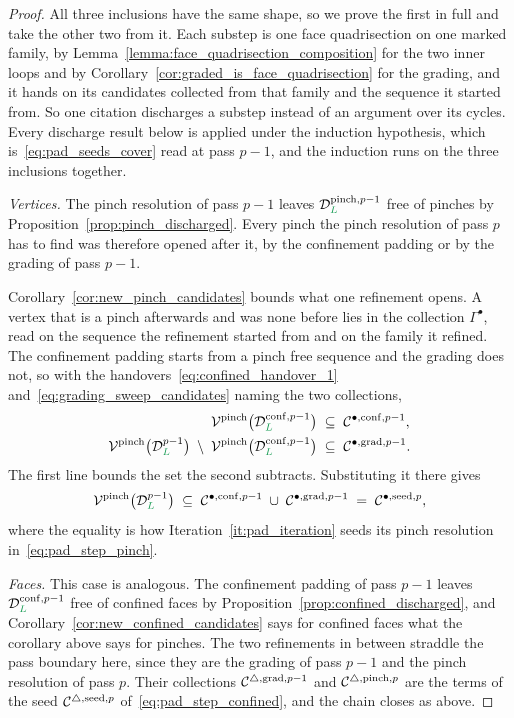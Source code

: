 \documentclass[a4paper, 12pt]{article}
\makeatletter
\newcommand{\collectV}{\Gamma^{\bullet}}                         %
\DeclareRobustCommand{\candV}[1][]{\mathcal{C}^{\bullet\ifx\@empty#1\@empty\else,#1\fi}}
\DeclareRobustCommand{\candF}[1][]{\mathcal{C}^{\triangle\ifx\@empty#1\@empty\else,#1\fi}}
\newcommand{\green}{\color{ForestGreen}}
\newcommand{\V}{\mathcal{V}}
\renewcommand{\L}{{\green L}}
\theoremstyle{definition}
\theoremstyle{plain}
\numberwithin{equation}{section}
\DeclareRobustCommand{\domseq}[1][]{\mathcal{D}\ifx\@empty#1\@empty\else_{#1}\fi}
\makeatother
\begin{document}
\begin{proof}
    All three inclusions have the same shape, so we prove the first in full and take the other two from it. Each substep is one face quadrisection on one marked family, by Lemma~\ref{lemma:face_quadrisection_composition} for the two inner loops and by Corollary~\ref{cor:graded_is_face_quadrisection} for the grading, and it hands on its candidates collected from that family and the sequence it started from. So one citation discharges a substep instead of an argument over its cycles. Every discharge result below is applied under the induction hypothesis, which is~\eqref{eq:pad_seeds_cover} read at pass $p \! - \! 1$, and the induction runs on the three inclusions together.

    \emph{Vertices.} The pinch resolution of pass $p \! - \! 1$ leaves $\domseq[\L]^{\mathrm{pinch},p-1}$ free of pinches by Proposition~\ref{prop:pinch_discharged}. Every pinch the pinch resolution of pass $p$ has to find was therefore opened after it, by the confinement padding or by the grading of pass $p \! - \! 1$.

    Corollary~\ref{cor:new_pinch_candidates} bounds what one refinement opens. A vertex that is a pinch afterwards and was none before lies in the collection $\collectV$, read on the sequence the refinement started from and on the family it refined. The confinement padding starts from a pinch free sequence and the grading does not, so with the handovers~\eqref{eq:confined_handover_1} and~\eqref{eq:grading_sweep_candidates} naming the two collections,
    \begin{align*}
        \V^{\mathrm{pinch}} \big( \domseq[\L]^{\mathrm{conf},p-1} \big) \; &\subseteq \; \candV[\mathrm{conf},p-1] , \\
        \V^{\mathrm{pinch}} \big( \domseq[\L]^{p-1} \big) \; \setminus \; \V^{\mathrm{pinch}} \big( \domseq[\L]^{\mathrm{conf},p-1} \big) \; &\subseteq \; \candV[\mathrm{grad},p-1] .
    \end{align*}
    The first line bounds the set the second subtracts. Substituting it there gives
    \begin{equation*}
        \V^{\mathrm{pinch}} \big( \domseq[\L]^{p-1} \big) \; \subseteq \; \candV[\mathrm{conf},p-1] \; \cup \; \candV[\mathrm{grad},p-1] \; = \; \candV[\mathrm{seed},p] ,
    \end{equation*}
    where the equality is how Iteration~\ref{it:pad_iteration} seeds its pinch resolution in~\eqref{eq:pad_step_pinch}.

    \emph{Faces.} This case is analogous. The confinement padding of pass $p \! - \! 1$ leaves $\domseq[\L]^{\mathrm{conf},p-1}$ free of confined faces by Proposition~\ref{prop:confined_discharged}, and Corollary~\ref{cor:new_confined_candidates} says for confined faces what the corollary above says for pinches. The two refinements in between straddle the pass boundary here, since they are the grading of pass $p \! - \! 1$ and the pinch resolution of pass $p$. Their collections $\candF[\mathrm{grad},p-1]$ and $\candF[\mathrm{pinch},p]$ are the terms of the seed $\candF[\mathrm{seed},p]$ of~\eqref{eq:pad_step_confined}, and the chain closes as above.


\end{proof}
\end{document}
